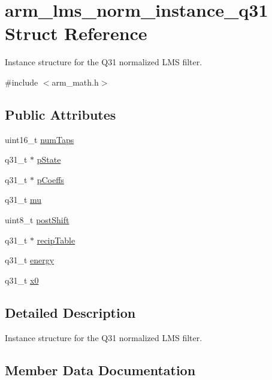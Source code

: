 \hypertarget{structarm__lms__norm__instance__q31}{}\section{arm\+\_\+lms\+\_\+norm\+\_\+instance\+\_\+q31 Struct Reference}
\label{structarm__lms__norm__instance__q31}


Instance structure for the Q31 normalized L\+MS filter.  




{\ttfamily \#include $<$arm\+\_\+math.\+h$>$}

\subsection*{Public Attributes}
\begin{DoxyCompactItemize}
\item 
uint16\+\_\+t \hyperlink{structarm__lms__norm__instance__q31_a28e4c085af69c9c3e2e95dacf8004c3e}{num\+Taps}
\item 
q31\+\_\+t $\ast$ \hyperlink{structarm__lms__norm__instance__q31_a6b25c96cf048b77078d62f4252a01ec4}{p\+State}
\item 
q31\+\_\+t $\ast$ \hyperlink{structarm__lms__norm__instance__q31_a57a64c1ff102d033c1bd05043f1d9955}{p\+Coeffs}
\item 
q31\+\_\+t \hyperlink{structarm__lms__norm__instance__q31_ad3dd2a2406e02fdaa7782ba6c3940a64}{mu}
\item 
uint8\+\_\+t \hyperlink{structarm__lms__norm__instance__q31_a28d7b9e437817f83397e081967e90f3c}{post\+Shift}
\item 
q31\+\_\+t $\ast$ \hyperlink{structarm__lms__norm__instance__q31_a85836d0907077b9ac660f7bbbaa9d694}{recip\+Table}
\item 
q31\+\_\+t \hyperlink{structarm__lms__norm__instance__q31_a3c0ae42869afec8555dc8e3a7ef9b386}{energy}
\item 
q31\+\_\+t \hyperlink{structarm__lms__norm__instance__q31_a47c4466d644e0d8ba407995adfa9b917}{x0}
\end{DoxyCompactItemize}


\subsection{Detailed Description}
Instance structure for the Q31 normalized L\+MS filter. 

\subsection{Member Data Documentation}
